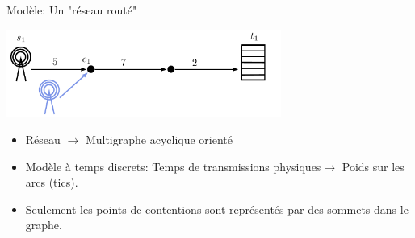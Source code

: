 \documentclass[10 pt]{beamer}
\begin{document}
\begin{frame}{Modèle: Un "réseau routé"}
\begin{center}
  \includegraphics [width=9cm]{1routealler} 
\end{center}

\begin{itemize}
\item Réseau $\rightarrow$ Multigraphe acyclique orienté
\item  Modèle à temps discrets: Temps de transmissions physiques$\rightarrow$ Poids sur les arcs (tics).
\item Seulement les points de contentions sont représentés par des sommets dans le graphe.
\end{itemize}

\begin{center}
  \end{center}


 \end{frame}
 
\end{document}
